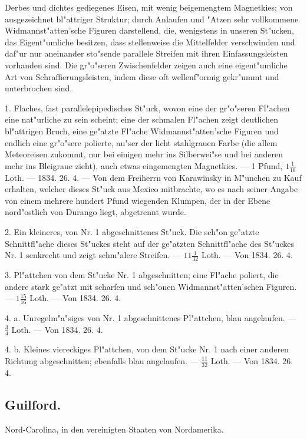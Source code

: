 \documentclass[a4paper, 11pt, oneside, polutonikogreek, german]{article}
\begin{document}
\setlength{\leftskip}{0pt}
\setlength{\parindent}{20pt}

Derbes und dichtes gediegenes Eisen, mit wenig beigemengtem Magnetkies; von ausgezeichnet bl"attriger Struktur; durch Anlaufen und "Atzen sehr vollkommene Widmannst"atten'sche Figuren darstellend, die, wenigstens in unseren St"ucken, das Eigent"umliche besitzen, dass stellenweise die Mittelfelder verschwinden und daf"ur nur aneinander sto"sende parallele Streifen mit ihren Einfassungsleisten vorhanden sind. Die gr"o"seren Zwischenfelder zeigen auch eine eigent"umliche Art von Schraffierungsleisten, indem diese oft wellenf"ormig gekr"ummt und unterbrochen sind.

1. Flaches, fast parallelepipedisches St"uck, wovon eine der gr"o"seren Fl"achen eine nat"urliche zu sein scheint; eine der schmalen Fl"achen zeigt deutlichen bl"attrigen Bruch, eine ge"atzte Fl"ache Widmannst"atten'sche Figuren und endlich eine gr"o"sere polierte, au"ser der licht stahlgrauen Farbe (die allem Meteoreisen zukommt, nur bei einigen mehr ins Silberwei"se und bei anderen mehr ins Bleigraue zieht), auch etwas eingemengten Magnetkies. --- 1 Pfund, $1\frac{1}{16}$ Loth. --- 1834. 26. 4. --- Von dem Freiherrn von Karawinsky in M"unchen zu Kauf erhalten, welcher dieses St"uck aus Mexico mitbrachte, wo es nach seiner Angabe von einem mehrere hundert Pfund wiegenden Klumpen, der in der Ebene nord"ostlich von Durango liegt, abgetrennt wurde.

2. Ein kleineres, von Nr. 1 abgeschnittenes St"uck. Die sch"on ge"atzte Schnittfl"ache dieses St"uckes steht auf der ge"atzten Schnittfl"ache des St"uckes Nr. 1 senkrecht und zeigt schm"alere Streifen. --- $11\frac{1}{32}$ Loth. --- Von 1834. 26. 4.

3. Pl"attchen von dem St"ucke Nr. 1 abgeschnitten; eine Fl"ache poliert, die andere stark ge"atzt mit scharfen und sch"onen Widmannst"atten'schen Figuren. --- $1\frac{15}{16}$ Loth. --- Von 1834. 26. 4.

4. a. Unregelm"a"siges von Nr. 1 abgeschnittenes Pl"attchen, blau angelaufen. --- $\frac{3}{4}$ Loth. --- Von 1834. 26. 4.

4. b. Kleines viereckiges Pl"attchen, von dem St"ucke Nr. 1 nach einer anderen Richtung abgeschnitten; ebenfalls blau angelaufen. --- $\frac{11}{32}$ Loth. --- Von 1834. 26. 4.
\subsection{Guilford.}
\begin{center}
\small
Nord-Carolina, in den vereinigten Staaten von Nordamerika.
\end{center}
\end{document}
